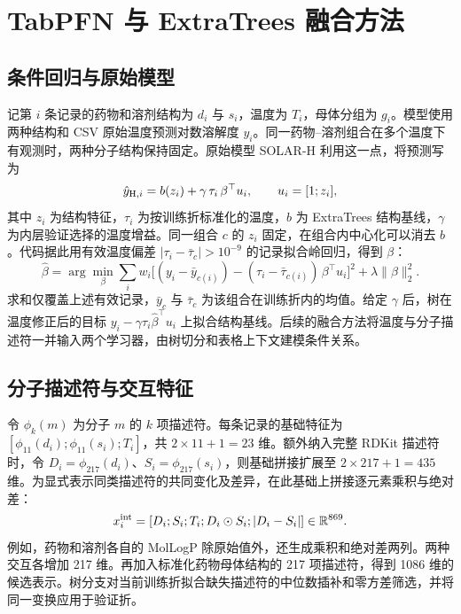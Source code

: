 \section{TabPFN 与 ExtraTrees 融合方法}
\subsection{条件回归与原始模型}
记第 $i$ 条记录的药物和溶剂结构为 $d_i$ 与 $s_i$，温度为 $T_i$，母体分组为 $g_i$。模型使用两种结构和 CSV 原始温度预测对数溶解度 $y_i$。同一药物--溶剂组合在多个温度下有观测时，两种分子结构保持固定。原始模型 SOLAR-H 利用这一点，将预测写为
\begin{equation}
\hat y_{{\rm H},i}=b(z_i)+\gamma\,\tau_i\,\beta^\top u_i,\qquad u_i=[1;z_i],
\end{equation}
其中 $z_i$ 为结构特征，$\tau_i$ 为按训练折标准化的温度，$b$ 为 ExtraTrees 结构基线，$\gamma$ 为内层验证选择的温度增益。同一组合 $c$ 的 $z_i$ 固定，在组合内中心化可以消去 $b$。代码据此用有效温度偏差 $|\tau_i-\bar\tau_c|>10^{-9}$ 的记录拟合岭回归，得到 $\beta$：
\begin{equation}
\hat\beta=\arg\min_\beta
\sum_i w_i\big[(y_i-\bar y_{c(i)})-(\tau_i-\bar\tau_{c(i)})\,\beta^\top u_i\big]^2
+\lambda\|\beta\|_2^2 .
\end{equation}
求和仅覆盖上述有效记录，$\bar y_c$ 与 $\bar\tau_c$ 为该组合在训练折内的均值。给定 $\gamma$ 后，树在温度修正后的目标 $y_i-\gamma\tau_i\hat\beta^\top u_i$ 上拟合结构基线。后续的融合方法将温度与分子描述符一并输入两个学习器，由树切分和表格上下文建模条件关系。

\subsection{分子描述符与交互特征}
令 $\phi_k(m)$ 为分子 $m$ 的 $k$ 项描述符。每条记录的基础特征为 $[\phi_{11}(d_i);\phi_{11}(s_i);T_i]$，共 $2\times11+1=23$ 维。额外纳入完整 RDKit 描述符时，令 $D_i=\phi_{217}(d_i)$、$S_i=\phi_{217}(s_i)$，则基础拼接扩展至 $2\times217+1=435$ 维。为显式表示同类描述符的共同变化及差异，在此基础上拼接逐元素乘积与绝对差：
\begin{equation}
x_i^{\rm int}
=[D_i;S_i;T_i;D_i\odot S_i;|D_i-S_i|]
\in\mathbb R^{869}.
\end{equation}
例如，药物和溶剂各自的 MolLogP 除原始值外，还生成乘积和绝对差两列。两种交互各增加 217 维。再加入标准化药物母体结构的 217 项描述符，得到 1086 维的候选表示。树分支对当前训练折拟合缺失描述符的中位数插补和零方差筛选，并将同一变换应用于验证折。

